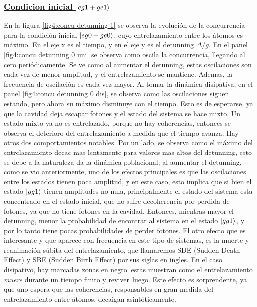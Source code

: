 \subsubsection{\underline{Condicion inicial $\ket{eg1+ge1}$}}
En la figura \ref{fig4:concu detunning 1} se observa la evolución de la concurrencia para la condición inicial $\ket{eg0+ge0}$, cuyo entrelazamiento entre los átomos es máximo. En el eje x es el tiempo, y en el eje y es el detunning $\Delta/g$. En el panel \ref{fig4:concu detunning 0 uni} se observa como oscila la concurrencia, llegando al cero periódicamente. Se ve como al aumentar el detunning, estas oscilaciones son cada vez de menor amplitud, y el entrelazamiento se mantiene. Ademas, la frecuencia de oscilación es cada vez mayor. Al tomar la dinámica disipativa, en el panel \ref{fig4:concu detunning 0 dis}, se observa como las oscilaciones siguen estando, pero ahora su máximo disminuye con el tiempo. Esto es de esperarse, ya que la cavidad deja escapar fotones y el estado del sistema se hace mixto. Un estado mixto ya no es entrelazado, porque no hay coherencias, entonces se observa el deterioro del entrelazamiento a medida que el tiempo avanza. Hay otros dos comportamientos notables. Por un lado, se observa como el máximo del entrelazamiento decae mas lentamente para valores mas altos del detunning, esto se debe a la naturaleza da la dinámica poblacional; al aumentar el detunning, como se vio anteriormente, uno de los efectos principales es que las oscilaciones entre los estados tienen poca amplitud, y en este caso, esto implica que si bien el estado $\ket{gg1}$ tienen amplitudes no nula, principalmente el estado del sistema esta concentrado en el estado inicial, que no sufre decoherencia por perdida de fotones, ya que no tiene fotones en la cavidad. Entonces, mientras mayor el detunning, menor la probabilidad de encontrar al sistema en el estado $\ket{gg1}$, y por lo tanto tiene pocas probabilidades de perder fotones. El otro efecto que es interesante y que aparece con frecuencia en este tipo de sistemas, es la muerte y reanimación súbita del entrelazamiento, que llamaremos SDE (Sudden Death Effect) y SBE (Sudden Birth Effect) por sus siglas en ingles. En el caso disipativo, hay marcadas zonas en negro, estas muestran como el entrelazamiento \textit{muere} durante un tiempo finito y reviven luego. Este efecto es sorprendente, ya que uno espera que las coherencias, responsables en gran medida del entrelazamiento entre átomos, decaigan asintóticamente. 

